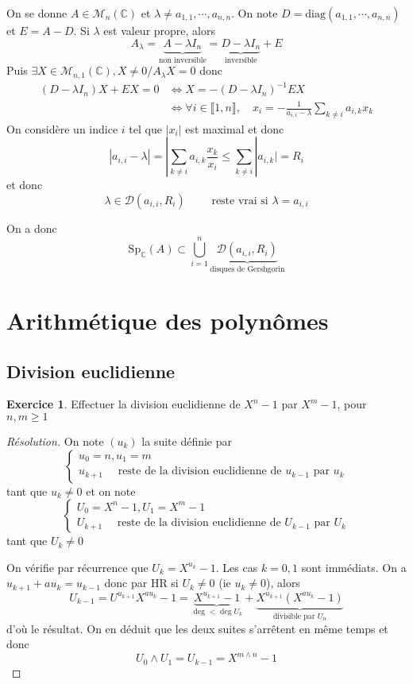\documentclass{article}
\theoremstyle{definition}
\newtheorem*{exo}{Exercice}
\begin{document}
On se donne $A\in\mathcal M_n(\mathbb C)$ et $\lambda\neq a_{1, 1}, \cdots, a_{n, n}$. On note $D=\mathrm{diag} (a_{1, 1}, \cdots, a_{n, n})$ et $E=A-D$. Si $\lambda$ est valeur propre, alors \[
    A_\lambda=\underbrace{A-\lambda I_n}_{\text{non inversible}}=\underbrace{D-\lambda I_n}_{\text{inversible}}+E
\]
Puis $\exists X\in\mathcal M_{n, 1}(\mathbb C), X\neq 0 / A_\lambda X=0$ donc \begin{align*}
    (D-\lambda I_n)X+EX=0&\iff X=-(D-\lambda I_n)^{-1}EX \\&\iff \forall i\in\llbracket 1, n\rrbracket, \quad x_i=-\frac1{a_{i, i}-\lambda}\sum_{k\neq i}a_{i, k}x_k
\end{align*}
On considère un indice $i$ tel que $|x_i|$ est maximal et donc \[
    |a_{i, i}-\lambda|=|\sum_{k\neq i}a_{i, k}\frac{x_k}{x_i}\leq \sum_{k\neq i}|a_{i, k}|=R_i
\]
et donc \[
    \lambda\in\mathcal D(a_{i, i}, R_i) \qquad \text{ reste vrai si } \lambda=a_{i, i}
\]

On a donc \[
    \mathrm{Sp}_{\mathbb C}(A)\subset \bigcup_{i=1}^n \underbrace{\mathcal D(a_{i, i}, R_i)}_{\text{disques de Gershgorin}}
\]

\section{Arithmétique des polynômes}

\subsection{Division euclidienne}

\begin{exo}
    Effectuer la division euclidienne de $X^n-1$ par $X^m-1$, pour $n, m\geq 1$
\end{exo}

\begin{proof}[Résolution]
    On note $(u_k)$ la suite définie par \[
        \begin{cases}
            u_0=n, u_1=m \\ u_{k+1} \quad \text{ reste de la division euclidienne de $u_{k-1}$ par $u_k$}
        \end{cases}
    \]
    tant que $u_k\neq 0$ et on note \[
        \begin{cases}
            U_0=X^n-1, U_1=X^m-1\\ U_{k+1}\quad \text{ reste de la division euclidienne de $U_{k-1}$ par $U_k$}
        \end{cases}
    \]
    tant que $U_k\neq 0$
    
    On vérifie par récurrence que $U_k=X^{u_k}-1$. Les cas $k=0, 1$ sont immédiats. On a $u_{k+1}+au_k=u_{k-1}$ donc par HR si $U_k\neq 0$ (ie $u_k\neq 0$), alors \[
        U_{k-1}=U^{u_{k+1}}X^{au_k}-1=\underbrace{X^{u_{k+1}}-1}_{\deg < \deg U_k}+\underbrace{X^{u_{k+1}}\left(X^{au_k}-1\right)}_{\text{divisible par } U_n}
    \]
    d'où le résultat. On en déduit que les deux suites s'arrêtent en même temps et donc \[
        U_0\land U_1=U_{k-1}=X^{m\land n}-1
    \]
\end{proof}
\end{document}
